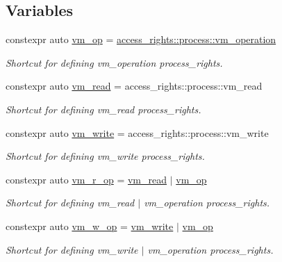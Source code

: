 \subsection*{Variables}
\begin{DoxyCompactItemize}
\item 
constexpr auto \mbox{\hyperlink{namespacedistant_af02d4223cd2f509cc373ac9d83655f19}{vm\+\_\+op}} = \mbox{\hyperlink{structdistant_1_1access__rights_ae153052a690584111c46ec7a78d1ef81a1dbc93eb33b2397084a918dd12439860}{access\+\_\+rights\+::process\+::vm\+\_\+operation}}
\begin{DoxyCompactList}\small\item\em Shortcut for defining vm\+\_\+operation process\+\_\+rights. \end{DoxyCompactList}\item 
constexpr auto \mbox{\hyperlink{namespacedistant_a671e87e004e808bfc0d54a4e816981df}{vm\+\_\+read}} = access\+\_\+rights\+::process\+::vm\+\_\+read
\begin{DoxyCompactList}\small\item\em Shortcut for defining vm\+\_\+read process\+\_\+rights. \end{DoxyCompactList}\item 
constexpr auto \mbox{\hyperlink{namespacedistant_a615d59c8cd8088e5d008fe35512e6d5e}{vm\+\_\+write}} = access\+\_\+rights\+::process\+::vm\+\_\+write
\begin{DoxyCompactList}\small\item\em Shortcut for defining vm\+\_\+write process\+\_\+rights. \end{DoxyCompactList}\item 
constexpr auto \mbox{\hyperlink{namespacedistant_a22f555d49d1219029220e53628459768}{vm\+\_\+r\+\_\+op}} = \mbox{\hyperlink{namespacedistant_a671e87e004e808bfc0d54a4e816981df}{vm\+\_\+read}} $\vert$ \mbox{\hyperlink{namespacedistant_af02d4223cd2f509cc373ac9d83655f19}{vm\+\_\+op}}
\begin{DoxyCompactList}\small\item\em Shortcut for defining vm\+\_\+read $\vert$ vm\+\_\+operation process\+\_\+rights. \end{DoxyCompactList}\item 
constexpr auto \mbox{\hyperlink{namespacedistant_a6312277824ed2f04c414a61f24c135bb}{vm\+\_\+w\+\_\+op}} = \mbox{\hyperlink{namespacedistant_a615d59c8cd8088e5d008fe35512e6d5e}{vm\+\_\+write}} $\vert$ \mbox{\hyperlink{namespacedistant_af02d4223cd2f509cc373ac9d83655f19}{vm\+\_\+op}}
\begin{DoxyCompactList}\small\item\em Shortcut for defining vm\+\_\+write $\vert$ vm\+\_\+operation process\+\_\+rights. \end{DoxyCompactList}\item 

\end{DoxyCompactItemize}
